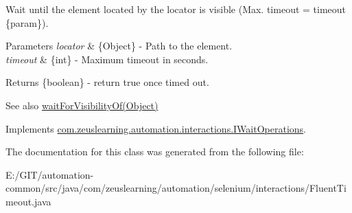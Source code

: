 Wait until the element located by the locator is visible (Max. timeout = timeout \{param\}).


\begin{DoxyParams}{Parameters}
{\em locator} & \{Object\} -\/ Path to the element. \\
\hline
{\em timeout} & \{int\} -\/ Maximum timeout in seconds.\\
\hline
\end{DoxyParams}
\begin{DoxyReturn}{Returns}
\{boolean\} -\/ return {\ttfamily true} once timed out.
\end{DoxyReturn}
\begin{DoxySeeAlso}{See also}
\hyperlink{classcom_1_1zeuslearning_1_1automation_1_1selenium_1_1interactions_1_1FluentTimeout_a189fae4d5e9985013b0e1b65c3d73d1f}{wait\+For\+Visibility\+Of(\+Object)} 
\end{DoxySeeAlso}


Implements \hyperlink{interfacecom_1_1zeuslearning_1_1automation_1_1interactions_1_1IWaitOperations_a608da544ffa2ea81c99c5cb17e8e60ba}{com.\+zeuslearning.\+automation.\+interactions.\+I\+Wait\+Operations}.



The documentation for this class was generated from the following file\+:\begin{DoxyCompactItemize}
\item 
E\+:/\+G\+I\+T/automation-\/common/src/java/com/zeuslearning/automation/selenium/interactions/Fluent\+Timeout.\+java\end{DoxyCompactItemize}
